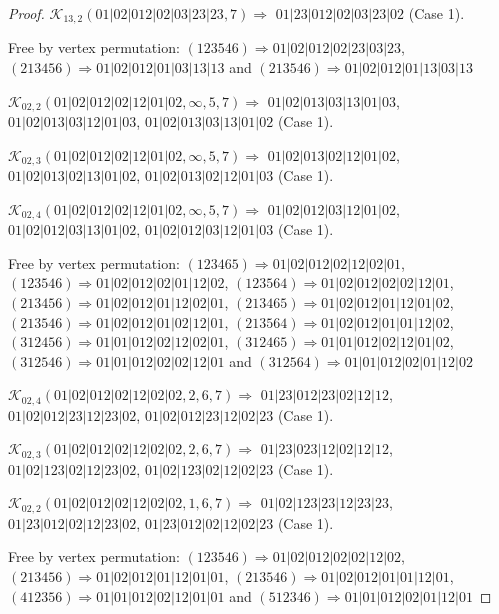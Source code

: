 \documentclass[12pt]{article}
\theoremstyle{plain}
\theoremstyle{definition}
\theoremstyle{remark}
\newcommand{\fancy}[1]{\mathcal{#1}}
\def\K{\fancy{K}}
\begin{document}
\begin{proof}
	$\K_{13,2}(01|02|012|02|03|23|23,7)\Rightarrow $ $01|23|012|02|03|23|02$ (Case 1).
	
	
	
	Free by vertex permutation: $(1 2 3 5 4 6)\Rightarrow 01|02|012|02|23|03|23$, $(2 1 3 4 5 6)\Rightarrow 01|02|012|01|03|13|13$ and $(2 1 3 5 4 6)\Rightarrow 01|02|012|01|13|03|13$
	
	
	
	\bigskip
	
	$\K_{02,2}(01|02|012|02|12|01|02,\infty,5, 7)\Rightarrow $ $01|02|013|03|13|01|03$, $01|02|013|03|12|01|03$, $01|02|013|03|13|01|02$ (Case 1).
	
	$\K_{02,3}(01|02|012|02|12|01|02,\infty,5, 7)\Rightarrow $ $01|02|013|02|12|01|02$, $01|02|013|02|13|01|02$, $01|02|013|02|12|01|03$ (Case 1).
	
	$\K_{02,4}(01|02|012|02|12|01|02,\infty,5, 7)\Rightarrow $ $01|02|012|03|12|01|02$, $01|02|012|03|13|01|02$, $01|02|012|03|12|01|03$ (Case 1).
	
	
	
	Free by vertex permutation: $(1 2 3 4 6 5)\Rightarrow 01|02|012|02|12|02|01$, $(1 2 3 5 4 6)\Rightarrow 01|02|012|02|01|12|02$, $(1 2 3 5 6 4)\Rightarrow 01|02|012|02|02|12|01$, $(2 1 3 4 5 6)\Rightarrow 01|02|012|01|12|02|01$, $(2 1 3 4 6 5)\Rightarrow 01|02|012|01|12|01|02$, $(2 1 3 5 4 6)\Rightarrow 01|02|012|01|02|12|01$, $(2 1 3 5 6 4)\Rightarrow 01|02|012|01|01|12|02$, $(3 1 2 4 5 6)\Rightarrow 01|01|012|02|12|02|01$, $(3 1 2 4 6 5)\Rightarrow 01|01|012|02|12|01|02$, $(3 1 2 5 4 6)\Rightarrow 01|01|012|02|02|12|01$ and $(3 1 2 5 6 4)\Rightarrow 01|01|012|02|01|12|02$
	
	
	
	\bigskip
	
	$\K_{02,4}(01|02|012|02|12|02|02,2, 6, 7)\Rightarrow $ $01|23|012|23|02|12|12$, $01|02|012|23|12|23|02$, $01|02|012|23|12|02|23$ (Case 1).
	
	$\K_{02,3}(01|02|012|02|12|02|02,2, 6, 7)\Rightarrow $ $01|23|023|12|02|12|12$, $01|02|123|02|12|23|02$, $01|02|123|02|12|02|23$ (Case 1).
	
	$\K_{02,2}(01|02|012|02|12|02|02,1, 6, 7)\Rightarrow $ $01|02|123|23|12|23|23$, $01|23|012|02|12|23|02$, $01|23|012|02|12|02|23$ (Case 1).
	
	
	
	Free by vertex permutation: $(1 2 3 5 4 6)\Rightarrow 01|02|012|02|02|12|02$, $(2 1 3 4 5 6)\Rightarrow 01|02|012|01|12|01|01$, $(2 1 3 5 4 6)\Rightarrow 01|02|012|01|01|12|01$, $(4 1 2 3 5 6)\Rightarrow 01|01|012|02|12|01|01$ and $(5 1 2 3 4 6)\Rightarrow 01|01|012|02|01|12|01$
	

\end{proof}
\end{document}
